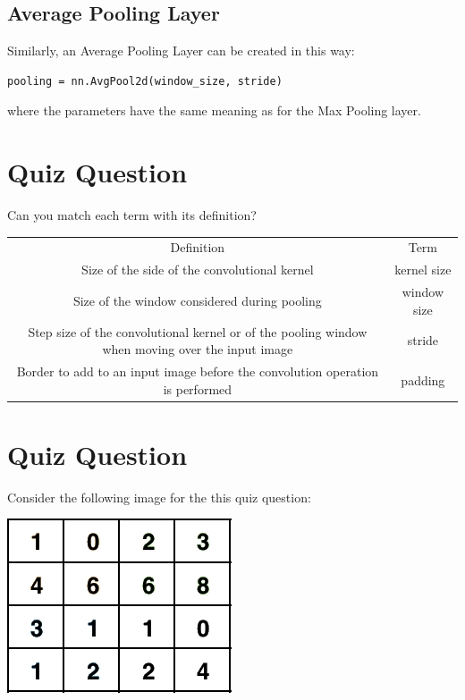 \subsection{Average Pooling Layer}

Similarly, an Average Pooling Layer can be created in this way:
\begin{lstlisting}
pooling = nn.AvgPool2d(window_size, stride)
\end{lstlisting}
where the parameters have the same meaning as for the Max Pooling layer.


\section{Quiz Question}

Can you match each term with its definition?

\begin{table}[!htbp]
    \centering
    \begin{tabular}{|c | c |}
    \hline 
        Definition & Term\\
        Size of the side of the convolutional kernel & kernel size\\
        Size of the window considered during pooling & window size\\
        Step size of the convolutional kernel or of the pooling window when moving over the input image & stride\\
        Border to add to an input image before the convolution operation is performed & padding\\
        \hline
    \end{tabular}
\end{table}

\section{Quiz Question}

Consider the following image for the this quiz question:

\includegraphics[width=0.5\linewidth]{img//cnn//depth/pooling-question.jpeg}

